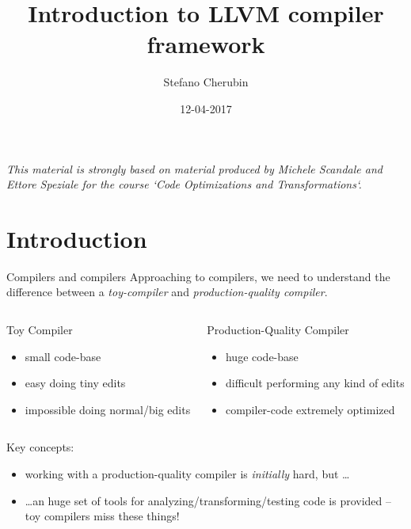 \documentclass[10pt,mathserif]{beamer}
\author{Stefano Cherubin}
\institute{Politecnico di Milano}
\date{12-04-2017}
\title{Introduction to LLVM compiler framework}
\begin{document}
\begin{frame}
\maketitle
\begin{center}
\itshape\scriptsize This material is strongly based on material produced by
                    Michele Scandale and Ettore Speziale for the course
                    `Code Optimizations and Transformations`.
\end{center}
\end{frame}

\section{Introduction}
\begin{frame}{Compilers and compilers}
Approaching to compilers, we need to understand the difference between a
\emph{toy-compiler} and \emph{production-quality compiler}.
\begin{columns}[t]
\begin{block}{Toy Compiler}
\begin{itemize}
\item small code-base
\item easy doing tiny edits
\item impossible doing normal/big edits
\end{itemize}
\end{block}

\begin{block}{Production-Quality Compiler}
\begin{itemize}
\item huge code-base
\item difficult performing any kind of edits
\item compiler-code extremely optimized
\end{itemize}
\end{block}
\end{columns}

\vfill
Key concepts:

\begin{itemize}
\item working with a production-quality compiler is \emph{initially} \alert{hard},
      but \ldots
\item \ldots an huge set of tools for analyzing/transforming/testing code
      is provided -- toy compilers \alert{miss these things}!
\end{itemize}
\end{frame}
\end{document}

